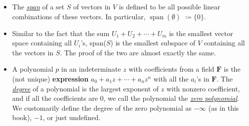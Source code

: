 \documentclass{article}
\newcommand{\df}[1]{\ul{\textit{#1}}}
\newcommand{\F}{\mathbf{F}}
\newcommand{\s}{\operatorname{span}}
\begin{document}
\begin{itemize}
    \item The \df{span} of a set $S$ of vectors in $V$ is defined to be all possible linear combinations of these vectors. In particular, $\s(\emptyset)$ $\coloneqq \{0\}$.
    \item Similar to the fact that the sum $U_1 + U_2 +\cdots+ U_m$ is the smallest vector space containing all $U_i$'s, span($S$) is the smallest subspace of $V$ containing all the vectors in $S$. The proof of the two are almost exactly the same.
    \item A polynomial $p$ in an indeterminate $z$ with coefficients from a field $\F$ is the (not unique) \textbf{expression} $a_0 + a_1 z + \cdots + a_n z^n$ with all the $a_i$'s in $\F$. The \df{degree} of a polynomial is the largest exponent of $z$ with nonzero coefficient, and if all the coefficients are 0, we call the polynomial the \df{zero polynomial}. We customarily define the degree of the zero polynomial as $-\infty$ (as in this book), $-1$, or just undefined.
    

\end{itemize}
\end{document}
